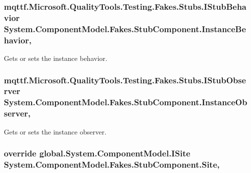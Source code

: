 \hypertarget{class_system_1_1_component_model_1_1_fakes_1_1_stub_component_a2c90b2b84bf43b507d8bcec0e065d588}{
\subsubsection[{Instance\-Behavior}]{\setlength{\rightskip}{0pt plus 5cm}mqttf.\-Microsoft.\-Quality\-Tools.\-Testing.\-Fakes.\-Stubs.\-I\-Stub\-Behavior System.\-Component\-Model.\-Fakes.\-Stub\-Component.\-Instance\-Behavior\hspace{0.3cm}{\ttfamily [get]}, {\ttfamily [set]}}}\label{class_system_1_1_component_model_1_1_fakes_1_1_stub_component_a2c90b2b84bf43b507d8bcec0e065d588}


Gets or sets the instance behavior.

\hypertarget{class_system_1_1_component_model_1_1_fakes_1_1_stub_component_a5e2454f262a41ff53f9b05255ee3a304}{
\subsubsection[{Instance\-Observer}]{\setlength{\rightskip}{0pt plus 5cm}mqttf.\-Microsoft.\-Quality\-Tools.\-Testing.\-Fakes.\-Stubs.\-I\-Stub\-Observer System.\-Component\-Model.\-Fakes.\-Stub\-Component.\-Instance\-Observer\hspace{0.3cm}{\ttfamily [get]}, {\ttfamily [set]}}}\label{class_system_1_1_component_model_1_1_fakes_1_1_stub_component_a5e2454f262a41ff53f9b05255ee3a304}


Gets or sets the instance observer.

\hypertarget{class_system_1_1_component_model_1_1_fakes_1_1_stub_component_a9ca954dd0f109278a0d86edc73e698de}{
\subsubsection[{Site}]{\setlength{\rightskip}{0pt plus 5cm}override global.\-System.\-Component\-Model.\-I\-Site System.\-Component\-Model.\-Fakes.\-Stub\-Component.\-Site\hspace{0.3cm}{\ttfamily [get]}, {\ttfamily [set]}}}\label{class_system_1_1_component_model_1_1_fakes_1_1_stub_component_a9ca954dd0f109278a0d86edc73e698de}


